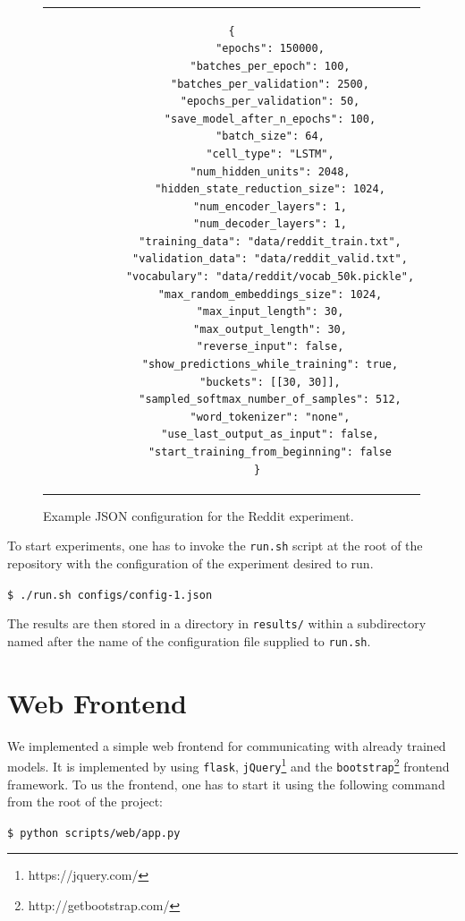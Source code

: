 \begin{figure}[thp]
	\centering
	\begin{tabular}{c}  %
		\begin{lstlisting}[style=json]
		{
			"epochs": 150000,
			"batches_per_epoch": 100,
			"batches_per_validation": 2500,
			"epochs_per_validation": 50,
			"save_model_after_n_epochs": 100,
			"batch_size": 64,
			"cell_type": "LSTM",
			"num_hidden_units": 2048,
			"hidden_state_reduction_size": 1024,
			"num_encoder_layers": 1,
			"num_decoder_layers": 1,
			"training_data": "data/reddit_train.txt",
			"validation_data": "data/reddit_valid.txt",
			"vocabulary": "data/reddit/vocab_50k.pickle",
			"max_random_embeddings_size": 1024,
			"max_input_length": 30,
			"max_output_length": 30,
			"reverse_input": false,
			"show_predictions_while_training": true,
			"buckets": [[30, 30]],
			"sampled_softmax_number_of_samples": 512,
			"word_tokenizer": "none",
			"use_last_output_as_input": false,
			"start_training_from_beginning": false
		}
		\end{lstlisting}
	\end{tabular}
	\label{software_usage:config_json_example}
	\caption{Example JSON configuration for the Reddit experiment.}
\end{figure}

To start experiments, one has to invoke the \texttt{run.sh} script at the root of the repository with the configuration of the experiment desired to run.

\texttt{\$ ./run.sh configs/config-1.json}

The results are then stored in a directory in \texttt{results/} within a subdirectory named after the name of the configuration file supplied to \texttt{run.sh}.

\section{Web Frontend}
\label{sofware_usage:web_frontend}
We implemented a simple web frontend for communicating with already trained models. It is implemented by using \texttt{flask}, \texttt{jQuery}\footnote{https://jquery.com/} and the \texttt{bootstrap}\footnote{http://getbootstrap.com/} frontend framework. To us the frontend, one has to start it using the following command from the root of the project:

\texttt{\$ python scripts/web/app.py}

